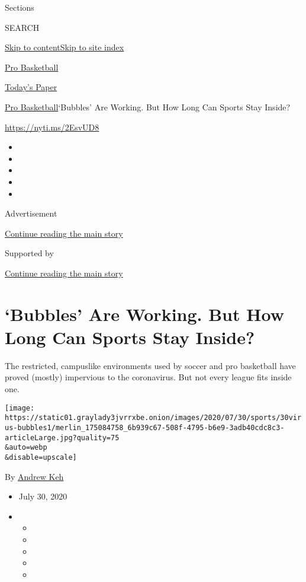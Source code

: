 Sections

SEARCH

\protect\hyperlink{site-content}{Skip to
content}\protect\hyperlink{site-index}{Skip to site index}

\href{https://www.nytimes3xbfgragh.onion/section/sports/basketball}{Pro
Basketball}

\href{https://myaccount.nytimes3xbfgragh.onion/auth/login?response_type=cookie\&client_id=vi}{}

\href{https://www.nytimes3xbfgragh.onion/section/todayspaper}{Today's
Paper}

\href{/section/sports/basketball}{Pro Basketball}\textbar{}`Bubbles' Are
Working. But How Long Can Sports Stay Inside?

\url{https://nyti.ms/2EsvUD8}

\begin{itemize}
\item
\item
\item
\item
\item
\end{itemize}

Advertisement

\protect\hyperlink{after-top}{Continue reading the main story}

Supported by

\protect\hyperlink{after-sponsor}{Continue reading the main story}

\hypertarget{bubbles-are-working-but-how-long-can-sports-stay-inside}{%
\section{`Bubbles' Are Working. But How Long Can Sports Stay
Inside?}\label{bubbles-are-working-but-how-long-can-sports-stay-inside}}

The restricted, campuslike environments used by soccer and pro
basketball have proved (mostly) impervious to the coronavirus. But not
every league fits inside one.

\texttt{[image: https://static01.graylady3jvrrxbe.onion/images/2020/07/30/sports/30virus-bubbles1/merlin\_175084758\_6b939c67-508f-4795-b6e9-3adb40cdc8c3-articleLarge.jpg?quality=75\\\&auto=webp\\\&disable=upscale]}

By \href{https://www.nytimes3xbfgragh.onion/by/andrew-keh}{Andrew Keh}

\begin{itemize}
\item
  July 30, 2020
\item
  \begin{itemize}
  \item
  \item
  \item
  \item
  \item
  \end{itemize}
\end{itemize}

